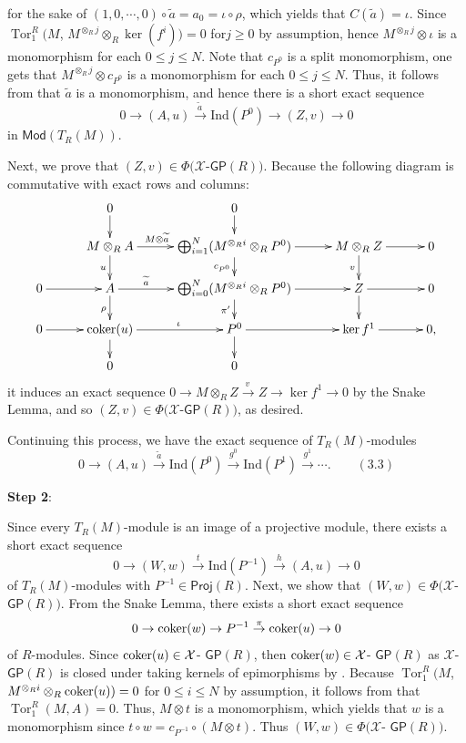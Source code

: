 \documentclass[10pt,twoside]{amsart}
\theoremstyle{bfupright head,slanted body}
\theoremstyle{bfupright head,upright body}
\theoremstyle{fixed bf head,slanted body}
\theoremstyle{fixed bf head,upright body}
\theoremstyle{numbered paragraph}
\newenvironment{prf*}[1][Proof]{%
  \begin{proof}[\bf #1]
    \setcounter{equation}{0}
    \renewcommand{\theequation}{\arabic{equation}}}
  {\end{proof}
  }
\numberwithin{equation}{res}
\newcommand{\GP}{\mathsf{GP}}
\newcommand{\Proj}{\mathsf{Proj}}
\newcommand{\Mod}{\mathsf{Mod}}
\newcommand{\Ind}{\mathrm{Ind}}
\newcommand{\cok}{\mbox{\rm coker}}
\newcommand{\Tor}{\operatorname{Tor}}
\begin{document}
\begin{prf*}
\begin{equation*}
\end{equation*}
for the sake of $(1,0,\cdots,0) \circ \widetilde{a}=a_0=\iota \circ \rho$, which yields that $C(\widetilde{a})=\iota$. 
Since $\Tor^R_1(M$, $M^{\otimes_Rj}\otimes_R\ker(f^{i}))=0$ for$j\geqslant 0$ by assumption,
hence $M^{\otimes_Rj}\otimes \iota$ is a monomorphism for each $0 \leqslant j \leqslant N$.
Note that $c_{P^{0}}$ is a split monomorphism,
one gets that $M^{\otimes_Rj}\otimes c_{P^{0}}$ is a monomorphism
for each $0 \leqslant j \leqslant N$.
Thus, it follows from \cite[Lemma 2.9]{DL} that $\widetilde{a}$ is a monomorphism, 
and hence there is a short exact sequence
$$ 0 \to (A, u) \overset{\widetilde{a}\,}\rightarrow \Ind(P^{0})\to (Z, v) \to 0$$
in $\Mod(T_R(M))$.

Next, we prove that $(Z, v) \in \Phi(\mathcal{X}$-$\GP(R))$.
Because the following diagram is commutative with exact rows and columns:
\begin{equation*} \label{factorization 1}
\xymatrix@C=1cm@R=0.5cm{
  & 0 \ar[d]^{} & 0 \ar[d]^{}  \\
  & M\otimes_R A \ar[d]_{u} \ar[r]^{M\otimes \widetilde{a} \,\,\, \qquad}
  & \bigoplus_{i=1}^N(M^{\otimes_Ri}\otimes_RP^{0}) \ar[d]_{c_{P^{0}}} \ar[r]^{}
  & M\otimes_R Z \ar[d]_{v} \ar[r]^{} & 0  \\
  0 \ar[r]^{}
  & A \ar[d]_{\rho} \ar[r]^-{\widetilde{a}}
  & \bigoplus_{i=0}^N(M^{\otimes_Ri}\otimes_RP^{0})
    \ar[d]_{\pi'} \ar[r]^{}
  & Z \ar[d]_{} \ar[r]^{} & 0  \\
  0 \ar[r]^{}
  & \cok(u) \ar[r]^{\quad \iota} \ar[d]^{}
  & P^{0} \ar[r]^{} \ar[d]^{}
  & \ker f^{1} \ar[r]^{}  & 0 , \\
  & 0  & 0   }
\end{equation*}
it induces an exact sequence
$0 \to M\otimes_R Z \overset{v \,}\rightarrow Z \to\ker f^{1} \to 0$
by the Snake Lemma, and so $(Z, v) \in \Phi(\mathcal{X}$-$\GP(R))$, as desired.

Continuing this process, we have the exact sequence of $T_R(M)$-modules
$$0 \to (A, u) \overset{\widetilde{a}}\to \Ind(P^{0})\overset{g^{0}}\to\Ind(P^{1}) \overset{g^{1}} \to \cdots. \qquad (3.3)$$

\textbf{Step 2}:

Since every $T_R(M)$-module is an image of a projective module, 
there exists a short exact sequence
$$ 0 \to (W, w) \overset{t}\longrightarrow \Ind(P^{-1})
             \overset{h}\longrightarrow (A, u) \to 0$$
of $T_R(M)$-modules with $P^{-1} \in \Proj(R)$.
Next, we show that $(W, w) \in \Phi(\mathcal{X}$-$\GP(R))$.
From the Snake Lemma,
there exists a short exact sequence
$$0 \to \cok(w) \to P^{-1} \overset{\pi}\to \cok(u) \to 0$$
of $R$-modules. Since $\cok(u)\in\mathcal{X}$- $\GP(R)$, then $\cok(w) \in \mathcal{X}$- $\GP(R)$ 
as $\mathcal{X}$- $\GP(R)$ is closed under taking kernels of epimorphisms by \cite[Theorem 2.3]{BO}.
Because $\Tor^R_1(M$, $M^{\otimes_Ri}\otimes_R\cok(u))=0$ for $0\leqslant i\leqslant N$ by assumption, 
it follows from \cite[Lemma 2.8]{DL} that $\Tor^R_1(M, A)=0$. Thus, $M\otimes t$ is a monomorphism, 
which yields that $w$ is a monomorphism since $t\circ w= c_{P^{-1}}\circ(M\otimes t)$.
Thus $(W, w) \in \Phi(\mathcal{X}$- $\GP(R))$.


\end{prf*}
\end{document}
